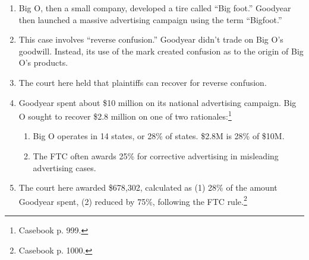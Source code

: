 \begin{enumerate}
    \item Big O, then a small company, developed a tire called ``Big foot.'' 
    Goodyear then launched a massive advertising campaign using the term 
    ``Bigfoot.''
    \item This case involves ``reverse confusion.'' Goodyear didn't trade on 
    Big O's goodwill. Instead, its use of the mark created confusion as to the 
    origin of Big O's products.
    \item The court here held that plaintiffs can recover for reverse 
    confusion.
    \item Goodyear spent about \$10 million on its national advertising 
    campaign. Big O sought to recover \$2.8 million on one of two 
    rationales:\footnote{Casebook p. 999.}
    \begin{enumerate}
        \item Big O operates in 14 states, or 28\% of states. \$2.8M is 28\% 
        of \$10M.
        \item The FTC often awards 25\% for corrective advertising in 
        misleading advertising cases.
    \end{enumerate}
    \item The court here awarded \$678,302, calculated as (1) 28\% of the 
    amount Goodyear spent, (2) reduced by 75\%, following the FTC 
    rule.\footnote{Casebook p. 1000.}
\end{enumerate}
